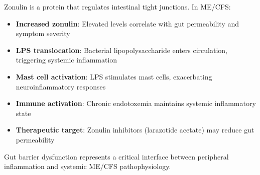 Zonulin is a protein that regulates intestinal tight junctions. In ME/CFS:

\begin{itemize}
    \item \textbf{Increased zonulin}: Elevated levels correlate with gut permeability and symptom severity
    \item \textbf{LPS translocation}: Bacterial lipopolysaccharide enters circulation, triggering systemic inflammation
    \item \textbf{Mast cell activation}: LPS stimulates mast cells, exacerbating neuroinflammatory responses
    \item \textbf{Immune activation}: Chronic endotoxemia maintains systemic inflammatory state
    \item \textbf{Therapeutic target}: Zonulin inhibitors (larazotide acetate) may reduce gut permeability
\end{itemize}

Gut barrier dysfunction represents a critical interface between peripheral inflammation and systemic ME/CFS pathophysiology.

